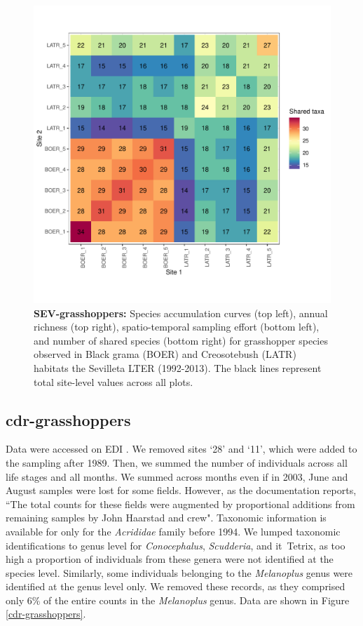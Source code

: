\documentclass[11pt, oneside]{article}
\begin{document}
\begin{figure}[h!]
\includegraphics[scale = 0.4]{sev-grasshopper-compagnoni_spp_shared.pdf}
\caption{{\bf SEV-grasshoppers:} Species accumulation curves (top left),  annual richness (top right), spatio-temporal sampling effort (bottom left), and number of shared species (bottom right) for grasshopper species observed in Black grama (BOER) and Creosotebush (LATR) habitats the Sevilleta LTER (1992-2013). The black lines represent total site-level values across all plots.}
\label{sev-grasshoppers}
\end{figure}


\subsection{cdr-grasshoppers}
Data were accessed on EDI \citep{cdr-grasshoppers}.
We removed sites `28' and `11', which were added to the sampling after 1989. 
Then, we summed the number of individuals across all life stages and all months. 
We summed across months even if in 2003, June and August samples were lost for some fields. 
However, as the documentation reports, ``The total counts for these fields were augmented by proportional additions from remaining samples by John Haarstad and crew".
Taxonomic information is available for only for the {\it Acrididae} family before 1994. 
We lumped taxonomic identifications to genus level for {\it Conocephalus}, {\it Scudderia}, and {it\ Tetrix}, as too high a proportion of individuals from these genera were not identified at the species level. 
Similarly, some individuals belonging to the {\it Melanoplus} genus were identified at the genus level only. 
We removed these records, as they comprised only 6$\%$ of the entire counts in the {\it Melanoplus} genus.
Data are shown in Figure \ref{cdr-grasshoppers}.
\end{document}
